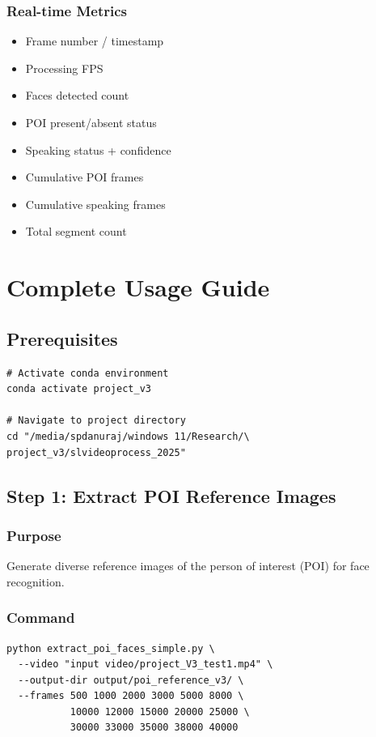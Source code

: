 \documentclass[11pt,a4paper]{article}
\begin{document}
\subsubsection{Real-time Metrics}

\begin{itemize}
    \item Frame number / timestamp
    \item Processing FPS
    \item Faces detected count
    \item POI present/absent status
    \item Speaking status + confidence
    \item Cumulative POI frames
    \item Cumulative speaking frames
    \item Total segment count
\end{itemize}

\section{Complete Usage Guide}

\subsection{Prerequisites}

\begin{lstlisting}[style=bashcode]
# Activate conda environment
conda activate project_v3

# Navigate to project directory
cd "/media/spdanuraj/windows 11/Research/\
project_v3/slvideoprocess_2025"
\end{lstlisting}

\subsection{Step 1: Extract POI Reference Images}

\subsubsection{Purpose}
Generate diverse reference images of the person of interest (POI) for face recognition.

\subsubsection{Command}
\begin{lstlisting}[style=bashcode]
python extract_poi_faces_simple.py \
  --video "input video/project_V3_test1.mp4" \
  --output-dir output/poi_reference_v3/ \
  --frames 500 1000 2000 3000 5000 8000 \
           10000 12000 15000 20000 25000 \
           30000 33000 35000 38000 40000
\end{lstlisting}
\end{document}
